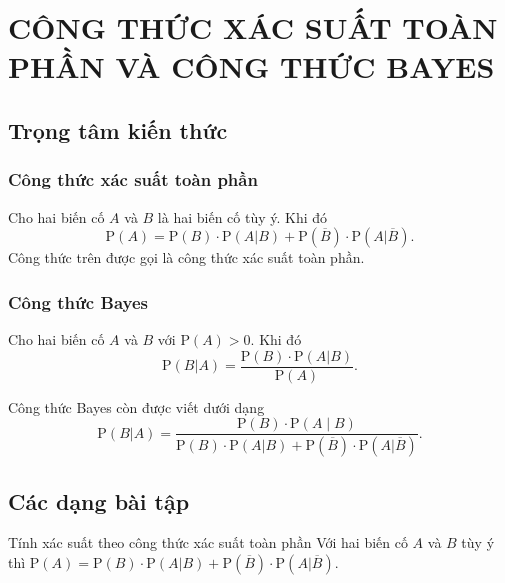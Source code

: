 \setcounter{section}{1}
\section{CÔNG THỨC XÁC SUẤT TOÀN PHẦN VÀ CÔNG THỨC BAYES}
\subsection{Trọng tâm kiến thức}
\begin{tomtat}
\subsubsection{Công thức xác suất toàn phần}
\begin{boxdn}
Cho hai biến cố $A$ và $B$ là hai biến cố tùy ý. Khi đó
$$\mathrm{P}(A)=\mathrm{P}(B)\cdot \mathrm{P}(A|B)+\mathrm{P}(\overline{B})\cdot \mathrm{P}(A|\overline{B}).$$
Công thức trên được gọi là công thức xác suất toàn phần.
\end{boxdn}
\subsubsection{Công thức Bayes}
\begin{boxdn}
Cho hai biến cố $A$ và $B$ với $\mathrm{P}(A)>0$. Khi đó
$$\mathrm{P}\left(B|A\right)=\dfrac{\mathrm{P}(B)\cdot\mathrm{P}\left(A|B\right)}{\mathrm{P}(A)}.$$
\end{boxdn}
\begin{note}
Công thức Bayes còn được viết dưới dạng 
$$\mathrm{P}(B | A)=\dfrac{\mathrm{P}(B) \cdot \mathrm{P}(A \mid B)}{\mathrm{P}(B)\cdot \mathrm{P}(A | B)+\mathrm{P}\left(\overline{B}\right)\cdot \mathrm{P}\left(A | \overline{B}\right)}.$$
\end{note}
\end{tomtat}
\subsection{Các dạng bài tập}
\setcounter{dang}{0}
\begin{dang}{Tính xác suất theo công thức xác suất toàn phần}
	Với hai biến cố $A$ và $B$ tùy ý thì
	$\mathrm{P}(A)=\mathrm{P}(B)\cdot\mathrm{P}(A|B)+\mathrm{P}(\overline{B})\cdot\mathrm{P}(A|\overline{B}).$
\end{dang}
